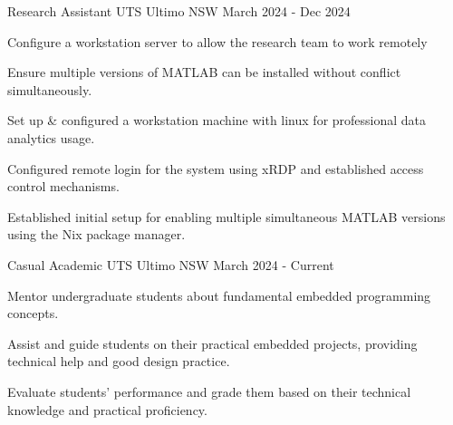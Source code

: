 \begin{cventries}
  \cventry
    {Research Assistant} %
    {UTS} %
    {Ultimo NSW} %
    {March 2024 - Dec 2024} %
    {
      \vspace{-4.0mm}
      \begin{cvsubentries}
      \end{cvsubentries}
      \vspace{4.0mm}
      \begin{cvitems} %
      \item {Configure a workstation server to allow the research team to work remotely}
      \item {Ensure multiple versions of MATLAB can be installed without conflict simultaneously.}
      \end{cvitems}
      \begin{cvsubentries}
      \end{cvsubentries}
      \vspace{4.0mm}
      \begin{cvitems} %
      \item {Set up \& configured a workstation machine with linux for professional data analytics usage.}
      \item {Configured remote login for the system using xRDP and established access control mechanisms.}
      \item {Established initial setup for enabling multiple simultaneous MATLAB versions using the Nix package manager.}
      \end{cvitems}
    }


  \cventry
    {Casual Academic} %
    {UTS} %
    {Ultimo NSW} %
    {March 2024 - Current} %
    {
      \vspace{-4.0mm}
      \begin{cvsubentries}
      \end{cvsubentries}
      \vspace{4.0mm}
      \begin{cvitems} %
      \item {Mentor undergraduate students about fundamental embedded programming concepts.}
      \item {Assist and guide students on their practical embedded projects, providing technical help and good design practice.}
      \item {Evaluate students' performance and grade them based on their technical knowledge and practical proficiency.}
      \end{cvitems}
    }
\end{cventries}

